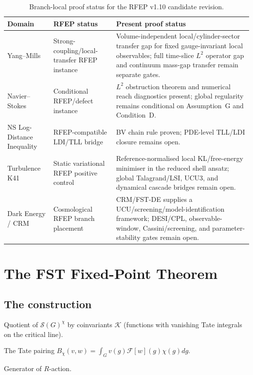 \documentclass[11pt,a4paper]{article}
\theoremstyle{plain}
\theoremstyle{definition}
\newcommand{\V}{\mathcal{V}}
\renewcommand{\S}{\mathcal{S}}
\newcommand{\K}{\mathcal{K}}
\newcommand{\chifn}{\chi}
\begin{document}
\begin{table}[h]
\centering
\begin{tabular}{p{} p{} p{}}
\toprule
Domain & RFEP status & Present proof status \\
\midrule
Yang--Mills & Strong-coupling/local-transfer RFEP instance &
Volume-independent local/cylinder-sector transfer gap for fixed
gauge-invariant local observables; full time-slice $L^2$ operator
gap and continuum mass-gap transfer remain separate gates. \\
Navier--Stokes & Conditional RFEP/defect instance &
$L^2$ obstruction theorem and numerical reach diagnostics present;
global regularity remains conditional on Assumption~G and
Condition~D. \\
NS Log-Distance Inequality & RFEP-compatible LDI/TLL bridge &
BV chain rule proven; PDE-level TLL/LDI closure remains open. \\
Turbulence K41 & Static variational RFEP positive control &
Reference-normalised local KL/free-energy minimiser in the reduced
shell ansatz; global Talagrand/LSI, UCU3, and dynamical cascade
bridges remain open. \\
Dark Energy / CRM & Cosmological RFEP branch placement &
CRM/FST-DE supplies a UCU/screening/model-identification framework;
DESI/CPL, observable-window, Cassini/screening, and
parameter-stability gates remain open. \\
\bottomrule
\end{tabular}
\caption{Branch-local proof status for the RFEP v1.10 candidate revision.}
\label{tab:domain-status}
\end{table}

\section{The FST Fixed-Point Theorem}
\label{sec:fixed-point}

\subsection{The construction}

\begin{description}[style=nextline]
\item[$\V_\chifn$] Quotient of $\S(G)^\chifn$ by coinvariants $\K$
  (functions with vanishing Tate integrals on the critical line).
\item[$B_\chifn$] The Tate pairing $B_\chifn(v, w) = \int_G v(g)
  \mathcal F[w](g) \chifn(g) dg$.
\item[$H_\chifn$] Generator of $R$-action.
\end{description}
\end{document}
